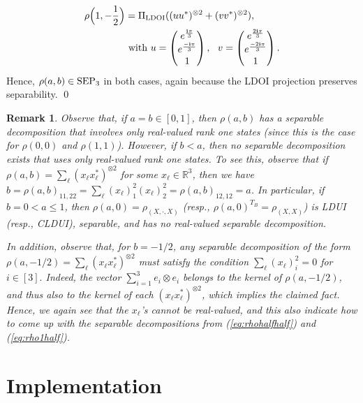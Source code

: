 \documentclass[11pt]{article}
\makeatletter
\newcommand{\R}{\ensuremath{\mathbb{R}}}   %
\newcommand{\SEP}{\text{\rm SEP}}
\newcommand{\LDOI}{\text{\rm LDOI}}
\newcommand{\ot}{\otimes}
\newcommand{\bfi}{\mathbf i}
\theoremstyle{plain}
\newtheorem{remark}[satz]{Remark}
\renewenvironment{proof}[1][\proofname]{%
  \par
  \pushQED{}%
  \normalfont
  \topsep6\p@\@plus6\p@
  \trivlist
  \item[\hskip\labelsep\itshape #1\@addpunct{.}]%
}{%
  \popQED
  \endtrivlist
}
\makeatother
\begin{document}
\begin{proof}
\begin{align}
\begin{split}
 \end{split}\end{align}
 \begin{align}
 \begin{split}
 \rho\Big(1,-{1\over 2}\Big)& = \Pi_{\LDOI} ((uu^*)^{\ot 2} + (vv^*)^{\ot 2}), \\
 & \text{ with }
u=\begin{pmatrix} e^{\bfi \pi\over 3}\cr e^{-\bfi \pi\over 3}\cr 1\end{pmatrix},\ \ 
v=\begin{pmatrix} e^{2\bfi \pi\over 3}\cr e^{-2\bfi \pi\over 3}\cr 1\end{pmatrix}. \label{eq:rho1half}
\end{split}
\end{align}
Hence, $\rho(a,b)\in\SEP_3$ in both cases, again because  the LDOI projection preserves separability.
\qed \end{proof}

\begin{remark}\label{rem:exampleab}
Observe that, if $a=b \in [0,1]$, then $\rho(a,b)$ has a   separable decomposition that involves only real-valued rank one states (since this is the case for $\rho(0,0)$ and $\rho(1,1)$). However, if $b<a$, then no  separable decomposition exists that uses only real-valued rank one states. To see this, observe that if $\rho(a,b)=\sum_\ell (x_\ell x_\ell^*)^{\ot 2}$ for some $x_\ell\in \R^3$, then we have
$b=\rho(a,b)_{11,22}= \sum_\ell (x_\ell)_1^2 (x_\ell)_2^2 =\rho(a,b)_{12,12}=a$.
In particular, if $b=0< a\le 1$, then $\rho(a,0)=\rho_{(X,\cdot,X)}$  (resp., $\rho(a,0)^{T_B}=\rho_{(X,X)}$) is LDUI (resp.,   CLDUI),  separable, and has   no real-valued separable decomposition.

In addition, observe that, for   $b=-1/2$, any separable decomposition of the form $\rho(a,-1/2)=\sum_\ell (x_\ell x_\ell^*)^{\ot 2}$ must satisfy the condition
$\sum_{\ell} (x_\ell)_i^2=0$ for $i\in [3].$ Indeed, the vector $\sum_{i=1}^3 e_i\ot e_i$ belongs to the kernel of $\rho(a,-1/2)$, and thus also to the kernel of each $(x _\ell x_\ell^*)^{\ot 2}$, which implies the claimed fact. 
Hence, we again see that the $x_\ell$'s cannot be real-valued, and this also indicate  how to come up with the separable decompositions from (\ref{eq:rhohalfhalf}) and (\ref{eq:rho1half}).
\end{remark}

\section{Implementation }\label{sec:implementation}
\end{document}
